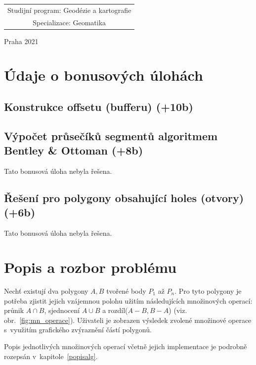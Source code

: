 \documentclass[a4paper, 12pt, oneside, titlepage]{article} %
\begin{document}
\begin{center}
\begin{tabular}{c}
Studijní program: Geodézie a kartografie \\
\noalign{\vspace{2mm}}

Specializace: Geomatika\\

\end{tabular}


\vfill

Praha 2021

\end{center}



\clearpage
\section{Údaje o bonusových úlohách}

\subsection{Konstrukce offsetu (bufferu) (+10b)}


\subsection{Výpočet průsečíků segmentů algoritmem Bentley \& Ottoman (+8b)}
Tato bonusová úloha nebyla řešena.

\subsection{Řešení pro polygony obsahující holes (otvory) (+6b)}
Tato bonusová úloha nebyla řešena.


\section{Popis a rozbor problému}
Nechť existují dva polygony $A,B$ tvořené body $P_1$ až $P_n$. Pro tyto polygony je potřeba zjistit jejich vzájemnou polohu užitím následujících množinových operací: průnik $A\cap B$, sjednocení $A\cup B$ a rozdíl($A-B, B-A$) (viz. obr.~\ref{fig:mn_operace}). Uživateli je zobrazen výsledek zvolené množinové operace s~využitím grafického zvýraznění částí polygonů.

Popis jednotlivých množinových operací včetně jejich implementace je podrobně rozepsán v~kapitole~\ref{popisalg}.
\end{document}
